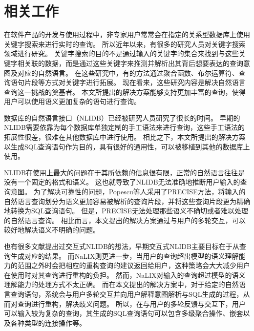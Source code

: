 \section{相关工作}
在软件产品的开发与使用过程中，非专家用户常常会在指定的关系型数据库上使用关键字搜索\cite{bhalotia2002keyword,yu2010keyword,agrawal2002dbxplorer,hristidis2002discover}来进行实时的查询。
所以近年以来，有很多的研究人员对关键字搜索领域进行研究\cite{tata2008sqak,simitsis2008precis,ganti2010keyword++,blunschi2012soda,bergamaschi2013quest}。
关键字搜索的目的不是通过输入的关键字的集合来找到与这些关键字相关联的数据，而是通过这些关键字来推测并解析出其背后想要表达的查询意图及对应的自然语言。
在这些研究中，有的方法通过聚合函数\cite{tata2008sqak}、布尔运算符\cite{simitsis2008precis}、查询语句片段\cite{blunschi2012soda}等方式对关键字进行拓展。
现在看来，这些研究内容是解决自然语言查询这一挑战的奠基者。
本文所提出的解决方案能够支持更加丰富的查询，使得用户可以使用语义更加复杂的语句进行查询。

数据库的自然语言接口（NLIDB）已经被研究人员研究了很长的时间\cite{Androutsopoulos1995Natural}。
早期的NLIDB需要依靠为每个数据库单独定制的手工语法来进行查询，这些手工语法的拓展性很差，很难在其他数据库中进行使用。
相比之下，本文所提出的解决方案以生成SQL查询语句作为目的，具有很好的通用性，可以被移植到其他的数据库上使用。
 
NLIDB在使用上最大的问题在于其所依赖的信息很有限，正常的自然语言往往是没有一个固定的格式和语义\cite{popescu2003towards}。
这也就导致了NLIDB无法准确地推断用户输入的查询意图。
为了解决可靠性的问题，Popescu等人\cite{popescu2003towards,popescu2004modern}采用了PRECISE方法，将输入的自然语言查询划分为语义更加容易被解析的查询片段，并将这些查询片段更为精确地转换为SQL查询语句。
但是，PRECISE无法处理那些语义不确切或者难以处理的自然语言查询。
相比而言，本文提出的解决方案通过与用户的多轮交互，可以较好地解决语义不明确的问题。

也有很多文献\cite{Androutsopoulos1995Natural,kuepper1993nauda,li2005nalix}提出过交互式NLIDB的想法，早期交互式NLIDB\cite{Androutsopoulos1995Natural,kuepper1993nauda}主要目标在于从查询生成对应的结果。
而NaLIX\cite{li2005nalix}则更进一步，当用户的查询超出模型的语义理解能力的范围之外时会把相应的重构查询的建议返回给用户，这种策略会大大减少用户在使用时对其查询进行重构的负担。
然而，NaLIX对输入的查询超过模型的语义理解能力的处理方式不太正确。
而在本文提出的解决方案中，对于给定的自然语言查询语句，系统会与用户多轮交互并向用户解释意图解析与SQL生成的过程，从而对查询进行重构，解决歧义问题。
所以，在与用户的多轮反馈与交互下，用户可以输入较为复杂的查询，其生成的SQL查询语句可以包含多级聚合操作、嵌套以及各种类型的连接操作等。

